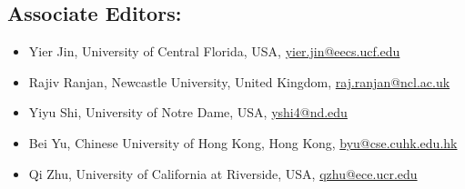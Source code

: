 \subsection*{Associate Editors:}

\begin{itemize}
    \item Yier Jin, University of Central Florida, USA,       \href{mailto:yier.jin@eecs.ucf.edu}{yier.jin@eecs.ucf.edu}
    \item Rajiv Ranjan, Newcastle University, United Kingdom, \href{mailto:raj.ranjan@ncl.ac.uk}{raj.ranjan@ncl.ac.uk}
    \item Yiyu Shi, University of Notre Dame, USA,            \href{mailto:yshi4@nd.edu}{yshi4@nd.edu}
    \item Bei Yu, Chinese University of Hong Kong, Hong Kong, \href{mailto:byu@cse.cuhk.edu.hk}{byu@cse.cuhk.edu.hk}
    \item Qi Zhu, University of California at Riverside, USA, \href{mailto:qzhu@ece.ucr.edu}{qzhu@ece.ucr.edu}
\end{itemize}




